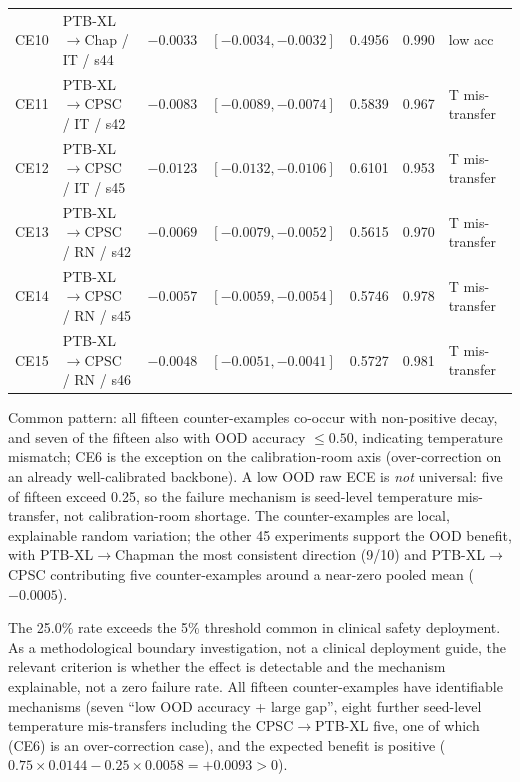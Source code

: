 \documentclass[review,12pt,nonatbib]{elsarticle}
\begin{document}
\begin{table}[tb]
{\begin{tabular}{llrrrrl}
CE10 & PTB-XL$\to$Chap / IT / s44 & $-0.0033$ & $[-0.0034,-0.0032]$ & 0.4956 & 0.990 & low acc \\
CE11 & PTB-XL$\to$CPSC / IT / s42 & $-0.0083$ & $[-0.0089,-0.0074]$ & 0.5839 & 0.967 & T mis-transfer \\
CE12 & PTB-XL$\to$CPSC / IT / s45 & $-0.0123$ & $[-0.0132,-0.0106]$ & 0.6101 & 0.953 & T mis-transfer \\
CE13 & PTB-XL$\to$CPSC / RN / s42 & $-0.0069$ & $[-0.0079,-0.0052]$ & 0.5615 & 0.970 & T mis-transfer \\
CE14 & PTB-XL$\to$CPSC / RN / s45 & $-0.0057$ & $[-0.0059,-0.0054]$ & 0.5746 & 0.978 & T mis-transfer \\
CE15 & PTB-XL$\to$CPSC / RN / s46 & $-0.0048$ & $[-0.0051,-0.0041]$ & 0.5727 & 0.981 & T mis-transfer \\
\bottomrule
\end{tabular}}
\end{table}

Common pattern: all fifteen counter-examples co-occur with non-positive
decay, and seven of the fifteen also with OOD accuracy $\leq 0.50$,
indicating temperature mismatch; CE6 is the exception on the
calibration-room axis (over-correction on an already well-calibrated
backbone). A low OOD raw ECE is \emph{not} universal: five of fifteen exceed
0.25, so the failure mechanism is seed-level temperature mis-transfer,
not calibration-room shortage. The counter-examples are local,
explainable random variation; the other 45 experiments support the OOD
benefit, with PTB-XL$\rightarrow$Chapman the most consistent direction
(9/10) and PTB-XL$\rightarrow$CPSC contributing five counter-examples
around a near-zero pooled mean ($-0.0005$).

The 25.0\% rate exceeds the 5\% threshold common in clinical safety
deployment. As a methodological boundary investigation, not a clinical
deployment guide, the relevant criterion is whether the effect is
detectable and the mechanism explainable, not a zero failure rate. All
fifteen counter-examples have identifiable mechanisms (seven ``low OOD
accuracy + large gap'', eight further seed-level temperature
mis-transfers including the CPSC$\rightarrow$PTB-XL five, one of which
(CE6) is an over-correction case), and the
expected benefit is positive
($0.75 \times 0.0144 - 0.25 \times 0.0058 = +0.0093 > 0$).

\end{document}
